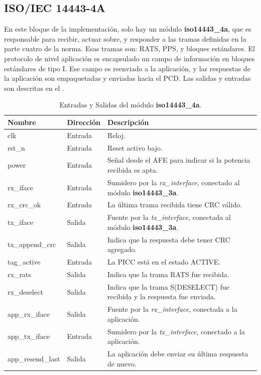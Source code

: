 \documentclass[a4paper, twoside, 11pt]{report}
\begin{document}
\FloatBarrier
\subsection{ISO/IEC 14443-4A}

En este bloque de la implementación, solo hay un módulo \textbf{iso14443\_4a}, que es responsable para recibir, actuar sobre, y responder a las tramas definidas en la parte cuatro de la norma. Esas tramas son: RATS, PPS, y bloques estándares. El protocolo de nivel aplicación es encapsulado un campo de información en bloques estándares de tipo I. Ese campo es reenviado a la aplicación, y las respuestas de la aplicación son empaquetadas y enviadas hacia el PCD. Las salidas y entradas son descritas en el .

\begin{table}[htb]
  \centering
  \tablezebra
  \begin{tabulary}{\linewidth}{l|l|L}
    \setcounter{rownum}{0}
    \textbf{Nombre}&\textbf{Dirección}&\textbf{Descripción} \\
    \hline
    clk&Entrada&Reloj. \\
    rst\_n&Entrada&Reset activo bajo. \\
    power&Entrada&Señal desde el AFE para indicar si la potencia recibida es apta. \\
    rx\_iface&Entrada&Sumidero por la \textit{rx\_interface}, conectado al módulo \textbf{iso14443\_3a}. \\
    rx\_crc\_ok&Entrada&La última trama recibida tiene CRC válido. \\
    tx\_iface&Salida&Fuente por la \textit{tx\_interface}, conectada al módulo \textbf{iso14443\_3a}. \\
    tx\_append\_crc&Salida&Indica que la respuesta debe tener CRC agregado. \\
    tag\_active&Entrada&La PICC está en el estado ACTIVE. \\
    rx\_rats&Salida&Indica que la trama RATS fue recibida. \\
    rx\_deselect&Salida&Indica que la trama S(DESELECT) fue recibida y la respuesta fue enviada. \\
    app\_rx\_iface&Salida&Fuente por la \textit{rx\_interface}, conectada a la aplicación. \\
    app\_tx\_iface&Entrada&Sumidero por la \textit{tx\_interface}, conectado a la aplicación. \\
    app\_resend\_last&Salida&La aplicación debe enviar su última respuesta de nuevo. \\
  \end{tabulary}
  \caption{Entradas y Salidas del módulo \textbf{iso14443\_4a}.}
  \label{tab:ports_iso14443_4a}
\end{table}
\end{document}

